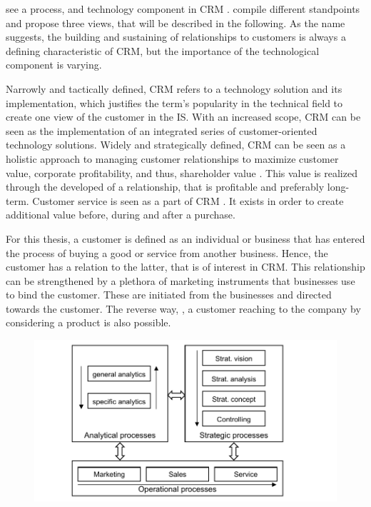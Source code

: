 		\citeauthor{Chen_2003} see a process,  and technology component in \acrshort{CRM} \citep{Chen_2003}. \cite{paynefrow2005} compile different standpoints and propose three views, that will be described in the following. As the name suggests, the building and sustaining of relationships to customers is always a defining characteristic of \acrshort{CRM}, but the importance of the technological component is varying. 
		
		Narrowly and tactically defined, \acrshort{CRM} refers to a technology solution and its implementation, which justifies the term's popularity in the technical field to create one view of the customer in the \acrshort{IS}. With an increased scope, \acrshort{CRM} can be seen as the implementation of an integrated series of customer-oriented technology solutions. Widely and strategically defined, \acrshort{CRM} can be seen as a holistic approach to managing customer relationships to maximize customer value, corporate profitability, and thus, shareholder value \citep{payne2004role}. This value is realized through the developed of a relationship, that is profitable and preferably long-term.  Customer service is seen as a part of \acrshort{CRM} \citep[]{Helmke_2012}. It exists in order to create additional value before, during and after a purchase. 
	
		For this thesis, a customer is defined as an individual or business that has entered the process of buying a good or service from another business. Hence, the customer has a relation to the latter, that is of interest in CRM. This relationship can be strengthened by a plethora of marketing instruments that businesses use to bind the customer. These are initiated from the businesses and directed towards the customer. The reverse way, \ie, a customer reaching to the company by considering a product is also possible. 
		
			\begin{figure}[caption={CRM processes}, label={fig:crmprocessfr}]
			{	\includegraphics[width=.8\textwidth]{figures/crmprocessfr.pdf}	
	\\
						 \parbox{0.53\textwidth}{}
			 } 

		\end{figure}
	
